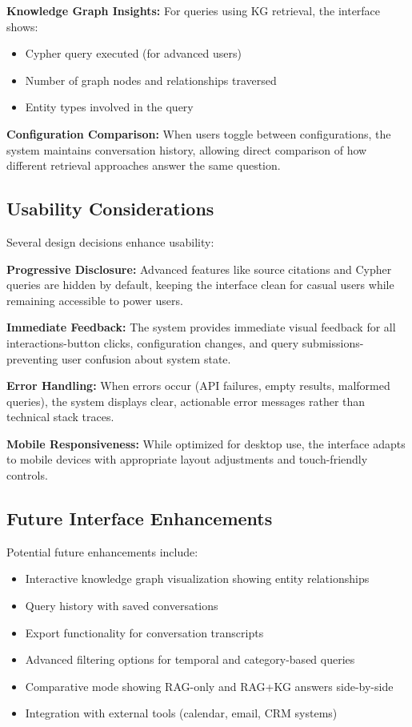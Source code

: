 \documentclass[11pt,twocolumn]{article}
\begin{document}
\textbf{Knowledge Graph Insights:} For queries using KG retrieval, the interface shows:
\begin{itemize}
\item Cypher query executed (for advanced users)
\item Number of graph nodes and relationships traversed
\item Entity types involved in the query
\end{itemize}

\textbf{Configuration Comparison:} When users toggle between configurations, the system maintains conversation history, allowing direct comparison of how different retrieval approaches answer the same question.

\subsection{Usability Considerations}

Several design decisions enhance usability:

\textbf{Progressive Disclosure:} Advanced features like source citations and Cypher queries are hidden by default, keeping the interface clean for casual users while remaining accessible to power users.

\textbf{Immediate Feedback:} The system provides immediate visual feedback for all interactions-button clicks, configuration changes, and query submissions-preventing user confusion about system state.

\textbf{Error Handling:} When errors occur (API failures, empty results, malformed queries), the system displays clear, actionable error messages rather than technical stack traces.

\textbf{Mobile Responsiveness:} While optimized for desktop use, the interface adapts to mobile devices with appropriate layout adjustments and touch-friendly controls.

\subsection{Future Interface Enhancements}

Potential future enhancements include:

\begin{itemize}
\item Interactive knowledge graph visualization showing entity relationships
\item Query history with saved conversations
\item Export functionality for conversation transcripts
\item Advanced filtering options for temporal and category-based queries
\item Comparative mode showing RAG-only and RAG+KG answers side-by-side
\item Integration with external tools (calendar, email, CRM systems)
\end{itemize}
\end{document}
